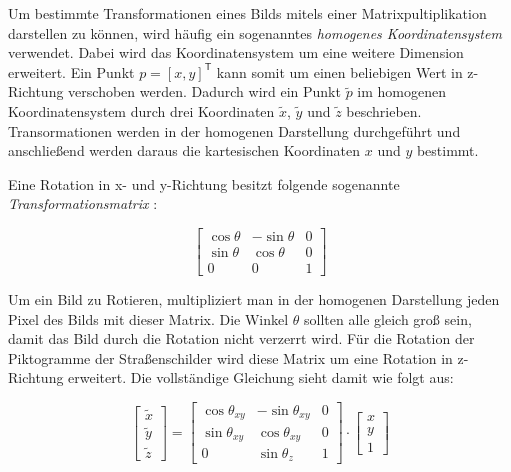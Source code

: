 Um bestimmte Transformationen eines Bilds mitels einer Matrixpultiplikation darstellen zu können, wird häufig ein sogenanntes \emph{homogenes Koordinatensystem} verwendet. Dabei wird das Koordinatensystem um eine weitere Dimension erweitert. Ein Punkt $p = [x, y]^\mathsf{T}$ kann somit um einen beliebigen Wert in z-Richtung verschoben werden. Dadurch wird ein Punkt $\tilde{p}$ im homogenen Koordinatensystem durch drei Koordinaten $\tilde{x}$, $\tilde{y}$ und $\tilde{z}$ beschrieben. Transormationen werden in der homogenen Darstellung durchgeführt und anschließend werden daraus die kartesischen Koordinaten $x$ und $y$ bestimmt. \cite{geometric-ops}

Eine Rotation in x- und y-Richtung besitzt folgende sogenannte \emph{Transformationsmatrix} \cite{geometric-ops}:

\begin{equation}
    \begin{bmatrix}
        \cos{\theta} & -\sin{\theta} & 0\\
        \sin{\theta} & \cos{\theta} & 0\\
        0 & 0 & 1
    \end{bmatrix}
\end{equation}

Um ein Bild zu Rotieren, multipliziert man in der homogenen Darstellung jeden Pixel des Bilds mit dieser Matrix. Die Winkel $\theta$ sollten alle gleich groß sein, damit das Bild durch die Rotation nicht verzerrt wird. Für die Rotation der Piktogramme der Straßenschilder wird diese Matrix um eine Rotation in z-Richtung erweitert. Die vollständige Gleichung sieht damit wie folgt aus:

\begin{equation}
    \begin{bmatrix} \tilde{x} \\ \tilde{y} \\ \tilde{z} \end{bmatrix}
    =
    \begin{bmatrix}
        \cos{\theta_{xy}} & -\sin{\theta_{xy}} & 0\\
        \sin{\theta_{xy}} & \cos{\theta_{xy}} & 0\\
        0                 & \sin{\theta_{z}} & 1
    \end{bmatrix}
    \cdot \begin{bmatrix} x \\ y \\ 1 \end{bmatrix}
\end{equation}

